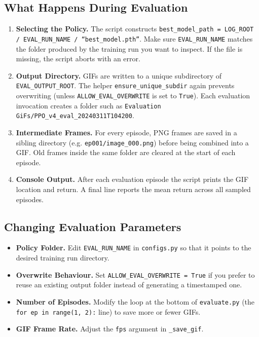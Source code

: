 \documentclass[12pt]{article}
\begin{document}
\subsection{What Happens During Evaluation}
\begin{enumerate}[leftmargin=1.2cm]
  \item \textbf{Selecting the Policy.} The script constructs \texttt{best\_model\_path = LOG\_ROOT / EVAL\_RUN\_NAME / ``best\_model.pth''}. Make sure \texttt{EVAL\_RUN\_NAME} matches the folder produced by the training run you want to inspect. If the file is missing, the script aborts with an error.
  \item \textbf{Output Directory.} GIFs are written to a unique subdirectory of \texttt{EVAL\_OUTPUT\_ROOT}. The helper \texttt{ensure\_unique\_subdir} again prevents overwriting (unless \texttt{ALLOW\_EVAL\_OVERWRITE} is set to \texttt{True}). Each evaluation invocation creates a folder such as \texttt{Evaluation GiFs/PPO\_v4\_eval\_20240311T104200}.
  \item \textbf{Intermediate Frames.} For every episode, PNG frames are saved in a sibling directory (e.g. \texttt{ep001/image\_000.png}) before being combined into a GIF. Old frames inside the same folder are cleared at the start of each episode.
  \item \textbf{Console Output.} After each evaluation episode the script prints the GIF location and return. A final line reports the mean return across all sampled episodes.
\end{enumerate}

\subsection{Changing Evaluation Parameters}
\begin{itemize}[leftmargin=1.2cm]
  \item \textbf{Policy Folder.} Edit \texttt{EVAL\_RUN\_NAME} in \texttt{configs.py} so that it points to the desired training run directory.
  \item \textbf{Overwrite Behaviour.} Set \texttt{ALLOW\_EVAL\_OVERWRITE = True} if you prefer to reuse an existing output folder instead of generating a timestamped one.
  \item \textbf{Number of Episodes.} Modify the loop at the bottom of \texttt{evaluate.py} (the \texttt{for ep in range(1, 2):} line) to save more or fewer GIFs.
  \item \textbf{GIF Frame Rate.} Adjust the \texttt{fps} argument in \texttt{\_save\_gif}.
\end{itemize}
\end{document}
